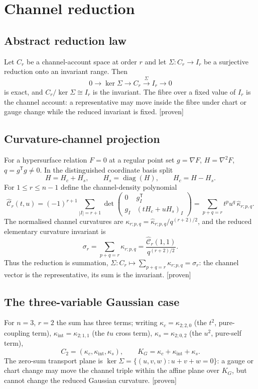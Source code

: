 \documentclass[11pt]{article}
\newcommand{\Proven}{\textsf{[proven]}}
\theoremstyle{plain}
\theoremstyle{definition}
\newcommand{\KG}{K_{G}}
\newcommand{\kc}{\kappa_{c}}
\newcommand{\kint}{\kappa_{\mathrm{int}}}
\newcommand{\ks}{\kappa_{s}}
\begin{document}
\section{Channel reduction}
\label{sec:channel}

\subsection{Abstract reduction law}
Let $C_r$ be a channel-account space at order $r$ and let $\Sigma:C_r\to I_r$ be a surjective
reduction onto an invariant range. Then
\[
0\longrightarrow\ker\Sigma\longrightarrow C_r\xrightarrow{\ \Sigma\ }I_r\longrightarrow0
\]
is exact, and $C_r/\ker\Sigma\cong I_r$ is the invariant. The fibre over a fixed value of $I_r$ is the
channel account: a representative may move inside the fibre under chart or gauge change while the
reduced invariant is fixed. \Proven

\subsection{Curvature-channel projection}
For a hypersurface relation $F=0$ at a regular point set $g=\nabla F$, $H=\nabla^2F$, $q=g^{\mathsf
T}g\ne0$. In the distinguished coordinate basis split
\[
H=H_c+H_s,\qquad H_s=\operatorname{diag}(H),\qquad H_c=H-H_s .
\]
For $1\le r\le n-1$ define the channel-density polynomial
\[
\widehat{\mathcal C}_r(t,u)
=(-1)^{r+1}\sum_{|I|=r+1}\det
\begin{pmatrix}0 & g_I^{\mathsf T}\\ g_I & (tH_c+uH_s)_I\end{pmatrix}
=\sum_{p+q=r}t^p u^q\,\widehat\kappa_{r;p,q}.
\]
The normalised channel curvatures are $\kappa_{r;p,q}=\widehat\kappa_{r;p,q}/q^{(r+2)/2}$, and the
reduced elementary curvature invariant is
\[
\sigma_r=\sum_{p+q=r}\kappa_{r;p,q}=\frac{\widehat{\mathcal C}_r(1,1)}{q^{(r+2)/2}} .
\]
Thus the reduction is summation, $\Sigma:C_r\mapsto\sum_{p+q=r}\kappa_{r;p,q}=\sigma_r$: the channel
vector is the representative, its sum is the invariant. \Proven

\subsection{The three-variable Gaussian case}
For $n=3$, $r=2$ the sum has three terms; writing $\kc=\kappa_{2;2,0}$ (the $t^2$, pure-coupling
term), $\kint=\kappa_{2;1,1}$ (the $tu$ cross term), $\ks=\kappa_{2;0,2}$ (the $u^2$, pure-self term),
\[
C_2=(\kc,\kint,\ks),\qquad \KG=\kc+\kint+\ks .
\]
The zero-sum transport plane is $\ker\Sigma=\{(u,v,w):u+v+w=0\}$: a gauge or chart change may move the
channel triple within the affine plane over $\KG$, but cannot change the reduced Gaussian curvature.
\Proven
\end{document}
